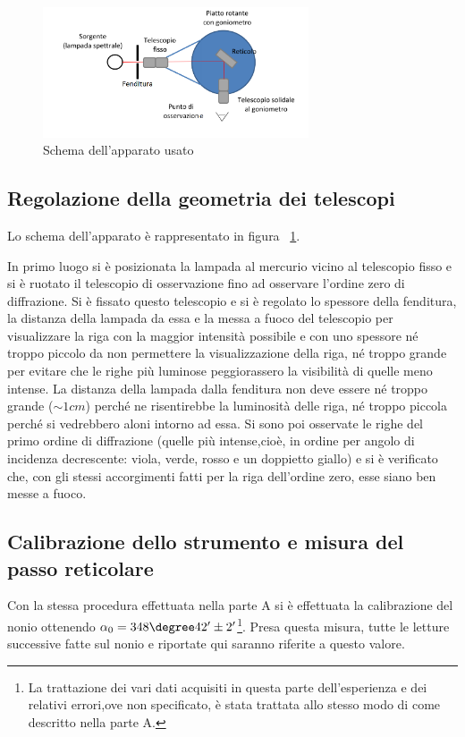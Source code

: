 \documentclass[a4paper,10pt]{article}
\begin{document}
{{{{{\begin{figure}[H]
	\centering
	\includegraphics[width=0.7\textwidth]{../grafici/Schema2.png}
	\caption{Schema dell'apparato usato}
	\label{fig:schema2}
\end{figure}

\subsection{Regolazione della geometria dei telescopi}
Lo schema dell'apparato è rappresentato in figura \figurename{~\ref{fig:schema2}}.

In primo luogo si è posizionata la lampada al mercurio vicino al telescopio fisso e si è ruotato il telescopio di osservazione fino ad osservare l'ordine zero di diffrazione. Si è fissato questo telescopio e si è regolato lo spessore della fenditura, la distanza della lampada da essa e la messa a fuoco del telescopio per visualizzare la riga con la maggior intensità possibile e con uno spessore né troppo piccolo da non permettere la visualizzazione della riga, né troppo grande per evitare che le righe più luminose peggiorassero la visibilità di quelle meno intense. La distanza della lampada dalla fenditura non deve essere né troppo grande ($\sim 1 cm$) perché ne risentirebbe la luminosità delle riga, né troppo piccola perché si vedrebbero aloni intorno ad essa.
Si sono poi osservate le righe del primo ordine di diffrazione (quelle più intense,cioè, in ordine per angolo di incidenza decrescente: viola, verde, rosso e un doppietto giallo) e si è verificato che, con gli stessi accorgimenti fatti per la riga dell'ordine zero, esse siano ben messe a fuoco.

\subsection{Calibrazione dello strumento e misura del passo reticolare}
Con la stessa procedura effettuata nella parte A si è effettuata la calibrazione del nonio ottenendo $\alpha_0 = 348\degree 42' \pm  2' $\footnote{La trattazione dei vari dati acquisiti in questa parte dell'esperienza e dei relativi errori,ove non specificato, è stata trattata allo stesso modo di come descritto nella parte A.}. Presa questa misura, tutte le letture successive fatte sul nonio e riportate qui saranno riferite a questo valore.


}}}}}
\end{document}
